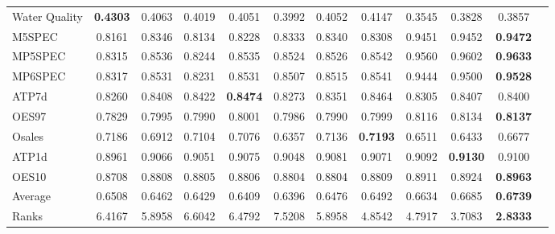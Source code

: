 \documentclass[preprint,12pt]{elsarticle}
\begin{document}
{\begin{table*}[thp!]
\begin{threeparttable}
{\begin{tabular}{lccccccccccc}
Water Quality &\textbf{0.4303} &0.4063 &0.4019 &0.4051 &0.3992 &0.4052 &0.4147 &0.3545 &0.3828 &0.3857 &  \\
M5SPEC &0.8161 &0.8346 &0.8134 &0.8228 &0.8333 &0.8340 &0.8308 &0.9451 &0.9452 &\textbf{0.9472} &  \\
MP5SPEC &0.8315 &0.8536 &0.8244 &0.8535 &0.8524 &0.8526 &0.8542 &0.9560 &0.9602 &\textbf{0.9633} &  \\
MP6SPEC &0.8317 &0.8531 &0.8231 &0.8531 &0.8507 &0.8515 &0.8541 &0.9444 &0.9500 &\textbf{0.9528} &  \\
ATP7d &0.8260 &0.8408 &0.8422 &\textbf{0.8474} &0.8273 &0.8351 &0.8464 &0.8305 &0.8407 &0.8400 &  \\
OES97 &0.7829 &0.7995 &0.7990 &0.8001 &0.7986 &0.7990 &0.7999 &0.8116 &0.8134 &\textbf{0.8137} &  \\
Osales &0.7186 &0.6912 &0.7104 &0.7076 &0.6357 &0.7136 &\textbf{0.7193} &0.6511 &0.6433 &0.6677 &  \\
ATP1d &0.8961 &0.9066 &0.9051 &0.9075 &0.9048 &0.9081 &0.9071 &0.9092 &\textbf{0.9130} &0.9100 &  \\
OES10 &0.8708 &0.8808 &0.8805 &0.8806 &0.8804 &0.8804 &0.8809 &0.8911 &0.8924 &\textbf{0.8963} &  \\
\hline
Average &0.6508 &0.6462 &0.6429 &0.6409 &0.6396 &0.6476 &0.6492 &0.6634 &0.6685 &\textbf{0.6739} &  \\
Ranks &6.4167 &5.8958 &6.6042 &6.4792 &7.5208 &5.8958 &4.8542 &4.7917 &3.7083 &\textbf{2.8333} &  \\
\bottomrule
\end{tabular}}
\end{threeparttable}
\label{tab:accresults}
\vspace{-2.5em}
\end{table*}
\begin{figure}[h!]
\centering
\small
{}
\end{figure}}
\end{document}
